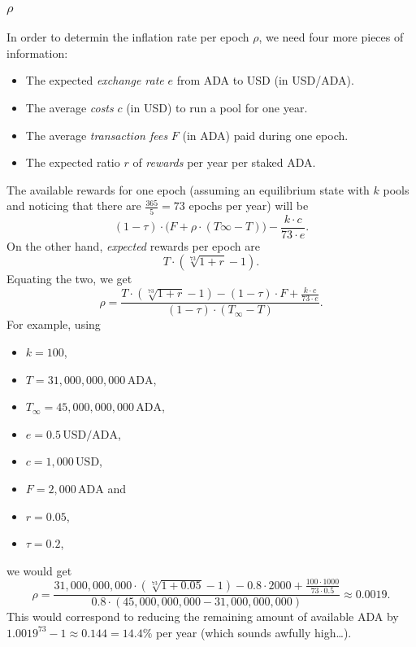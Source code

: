 \documentclass[11pt,a4paper]{article}
\begin{document}
\subsubsection{\texorpdfstring{\(\rho\)}{\textbackslash{}rho}}

In order to determin the inflation rate per epoch \(\rho\), we need four
more pieces of information:

\begin{itemize}
\item
  The expected \emph{exchange rate} \(e\) from ADA to USD (in USD/ADA).
\item
  The average \emph{costs} \(c\) (in USD) to run a pool for one year.
\item
  The average \emph{transaction fees} \(F\) (in ADA) paid during one
  epoch.
\item
  The expected ratio \(r\) of \emph{rewards} per year per staked ADA.
\end{itemize}

The available rewards for one epoch (assuming an equilibrium state with
\(k\) pools and noticing that there are \(\frac{365}{5}=73\) epochs per
year) will be \[
    \left(1-\tau\right)\cdot\bigl(F + \rho\cdot\left(T\infty - T\right)\bigr) - \frac{k\cdot c}{73\cdot e}.
\] On the other hand, \emph{expected} rewards per epoch are \[
    T\cdot\left(\sqrt[73]{1+r}-1\right).
\] Equating the two, we get \[
    \rho=\frac{T\cdot\left(\sqrt[73]{1+r}-1\right)-(1-\tau)\cdot F+\frac{k\cdot c}{73\cdot e}}{\left(1-\tau\right)\cdot\left(T_\infty-T\right)}.
\] For example, using

\begin{itemize}
\item
  \(k=100\),
\item
  \(T=31,000,000,000\,\mathrm{ADA}\),
\item
  \(T_\infty=45,000,000,000\,\mathrm{ADA}\),
\item
  \(e=0.5\,\mathrm{USD/ADA}\),
\item
  \(c=1,000\,\mathrm{USD}\),
\item
  \(F=2,000\,\mathrm{ADA}\) and
\item
  \(r=0.05\),
\item
  \(\tau=0.2\),
\end{itemize}

we would get \[
    \rho=\frac
        {31,000,000,000\cdot\left(\sqrt[73]{1+0.05}-1\right)-0.8\cdot 2000+\frac{100\cdot 1000}{73\cdot 0.5}}
        {0.8\cdot\left(45,000,000,000 - 31,000,000,000\right)}
    \approx
    0.0019.
\] This would correspond to reducing the remaining amount of available
ADA by \({1.0019}^{73}-1\approx 0.144=14.4\%\) per year (which sounds
awfully high\ldots).
\end{document}
